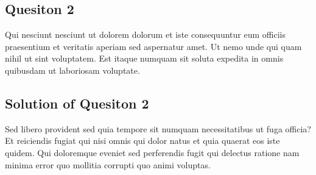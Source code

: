 \documentclass[11pt]{article}
\begin{document}
\subsection*{Quesiton 2}

Qui nesciunt nesciunt ut dolorem dolorum et iste consequuntur eum officiis praesentium et veritatis aperiam sed aspernatur amet. Ut nemo unde qui quam nihil ut sint voluptatem. Est itaque numquam sit soluta expedita in omnis quibusdam ut laboriosam voluptate.

\subsection*{Solution of Quesiton 2}

Sed libero provident sed quia tempore sit numquam necessitatibus ut fuga officia? Et reiciendis fugiat qui nisi omnis qui dolor natus et quia quaerat eos iste quidem. Qui doloremque eveniet sed perferendis fugit qui delectus ratione nam minima error quo mollitia corrupti quo animi voluptas.
\end{document}
